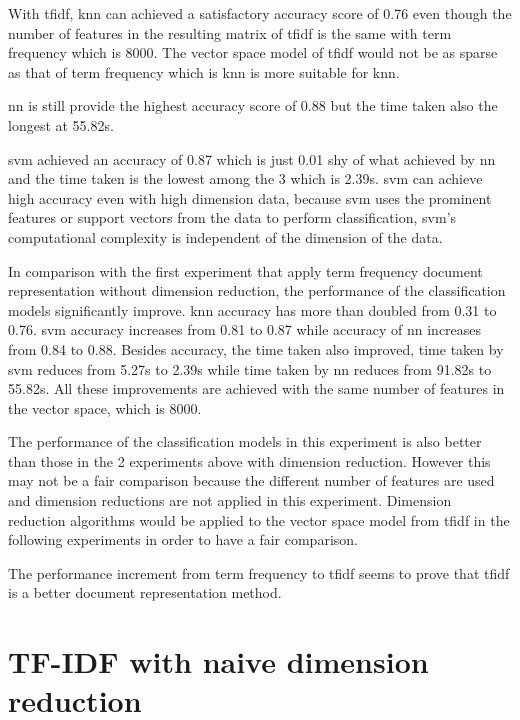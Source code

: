 With \ac{tfidf}, \ac{knn} can achieved a satisfactory accuracy score of 0.76 even though the number of features in the resulting matrix of \ac{tfidf} is the same with term frequency which is 8000. The vector space model of \ac{tfidf} would not be as sparse as that of term frequency which is \ac{knn} is more suitable for \ac{knn}.

\Ac{nn} is still provide the highest accuracy score of 0.88 but the time taken also the longest at 55.82s.

\Ac{svm} achieved an accuracy of 0.87 which is just 0.01 shy of what achieved by \ac{nn} and the time taken is the lowest among the 3 which is 2.39s. \Ac{svm} can achieve high accuracy even with high dimension data, because \ac{svm} uses the prominent features or support vectors from the data to perform classification, \ac{svm}'s computational complexity is independent of the dimension of the data. \cite{dimRedCat}

In comparison with the first experiment that apply term frequency document representation without dimension reduction, the performance of the classification models significantly improve. \Ac{knn} accuracy has more than doubled from 0.31 to 0.76. \Ac{svm} accuracy increases from 0.81 to 0.87 while accuracy of \ac{nn} increases from  0.84 to 0.88. Besides accuracy, the time taken also improved, time taken by \ac{svm} reduces from 5.27s to 2.39s while time taken by \ac{nn} reduces from 91.82s to 55.82s. All these improvements are achieved with the same number of features in the vector space, which is 8000. 

The performance of the classification models in this experiment is also better than those in the 2 experiments above with dimension reduction. However this may not be a fair comparison because the different number of features are used and dimension reductions are not applied in this experiment. Dimension reduction algorithms would be applied to the vector space model from \ac{tfidf} in the following experiments in order to have a fair comparison.

The performance increment from term frequency to \ac{tfidf} seems to prove that \ac{tfidf} is a better document representation method.\\

\clearpage
\section{TF-IDF with naive dimension reduction}

